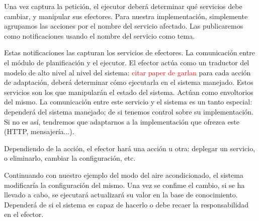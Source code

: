 Una vez captura la petición, el ejecutor deberá determinar qué servicios debe cambiar, y manipular sus efectores. Para nuestra implementación, simplemente agrupamos las acciones por el nombre del servicio afectado. Las publicaremos como notificaciones usando el nombre del servicio como tema.

Estas notificaciones las capturan los servicios de efectores.
La comunicación entre el módulo de planificación  y el ejecutor. El efector actúa como un traductor del modelo de alto nivel al nivel del sistema: \textcolor{red}{citar paper de garlan} para cada acción de adaptación, deberá determinar cómo ejecutarla en el sistema manejado. Estos servicios son los que manipularán el estado del sistema. Actúan como envoltorios del mismo. La comunicación entre este servicio y el sistema es un tanto especial: dependerá del sistema manejado; de si tenemos control sobre su implementación. Si no es así, tendremos que adaptarnos a la implementación que ofrezca este (HTTP, mensajería...).

Dependiendo de la acción, el efector hará una acción u otra: deplegar un servicio, o eliminarlo, cambiar la configuración, etc.

Continuando con nuestro ejemplo del modo del aire acondicionado, el sistema modificaría la configuración del mismo. Una vez se confime el cambio, si se ha llevado a cabo, se ejecutará actualizará su valor en la base de conocimiento. Dependerá de si el sistema es capaz de hacerlo o debe recaer la responsabilidad en el efector.
